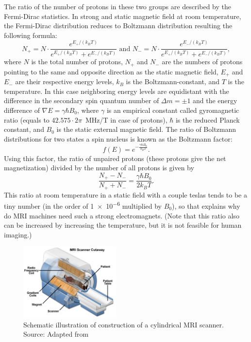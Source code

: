 The ratio of the number of protons in these two groups are described by the Fermi-Dirac statistics. In strong and static magnetic field at room temperature, the Fermi-Dirac distribution reduces to Boltzmann distribution resulting the following formula:
\[N_+ = N \cdot \frac{e^{E_+ / (k_B T)}}{e^{E_+ / (k_B T)} + e^{E_- / (k_B T)}} \text{ and } N_- = N \cdot \frac{e^{E_- / (k_B T)}}{e^{E_+ / (k_B T)} + e^{E_- / (k_B T)}},\]
where $N$ is the total number of protons, $N_+$ and $N_-$ are the numbers of protons pointing to the same and opposite direction as the static magnetic field, $E_+$ and $E_-$ are their respective energy levels, $k_B$ is the Boltzmann-constant, and $T$ is the temperature. In this case neighboring energy levels are equidistant with the difference in the secondary spin quantum number of $\Delta m = \pm 1$ and the energy difference of $\nabla E = \gamma \hbar B_0$, where $\gamma$ is an empirical constant called gyromagnetic ratio (equals to $42.575 \cdot 2\pi$\SI{}{\mega\hertz/\tesla} in case of protons), $\hbar$ is the reduced Planck constant, and $B_0$ is the static external magnetic field. The ratio of Boltzmann distributions for two states a spin \textonehalf nucleus is known as the Boltzmann factor:
\[f(E) = e^{-\frac{\gamma \hbar B_0}{k_B T}}.\]
Using this factor, the ratio of unpaired protons (these protons give the net magnetization) divided by the number of all protons is given by
\[\frac{N_+ - N_-}{N_+ + N_-} = \frac{\gamma \hbar B_0}{2 k_B T}.\]
This ratio at room temperature in a static field with a couple teslas tends to be a tiny number (in the order of \num{1e-6} multiplied by $B_0$), so that explains why do MRI machines need such a strong electromagnets. (Note that this ratio also can be increased by increasing the temperature, but it is not feasible for human imaging.)

\begin{figure}
    \centering
    \includegraphics[width=0.45\textwidth]{images/mri-scanner.jpg}
    \caption{Schematic illustration of construction of a cylindrical MRI scanner.\\
    Source: Adapted from~\cite{coyne_mri_2020}}
    \label{fig:mri_schematic}
\end{figure}

